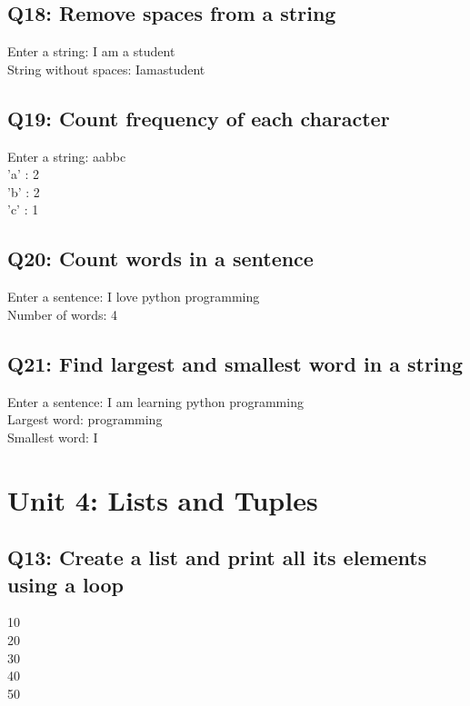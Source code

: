 \documentclass[11pt,a4paper]{article}
\begin{document}
\subsection{Q18: Remove spaces from a string}
\begin{outputbox}
Enter a string: I am a student\\
String without spaces: Iamastudent
\end{outputbox}

\subsection{Q19: Count frequency of each character}
\begin{outputbox}
Enter a string: aabbc\\
'a' : 2\\
'b' : 2\\
'c' : 1
\end{outputbox}

\subsection{Q20: Count words in a sentence}
\begin{outputbox}
Enter a sentence: I love python programming\\
Number of words: 4
\end{outputbox}

\subsection{Q21: Find largest and smallest word in a string}
\begin{outputbox}
Enter a sentence: I am learning python programming\\
Largest word: programming\\
Smallest word: I
\end{outputbox}

\section{Unit 4: Lists and Tuples}

\subsection{Q13: Create a list and print all its elements using a loop}
\begin{outputbox}
10\\
20\\
30\\
40\\
50
\end{outputbox}
\end{document}
